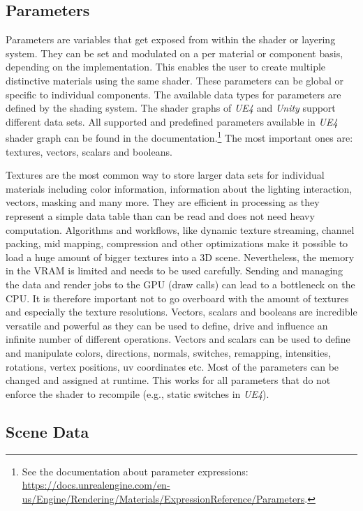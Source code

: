 	\subsection{Parameters}
	
		Parameters are variables that get exposed from within the shader or layering system. They can be set and modulated on a per material or component basis, depending on the implementation. This enables the user to create multiple distinctive materials using the same shader. These parameters can be global or specific to individual components. The available data types for parameters are defined by the shading system. The shader graphs of \emph{UE4} and \emph{Unity} support different data sets. All supported and predefined parameters available in \emph{UE4} shader graph can be found in the documentation.\footnote{See the documentation about parameter expressions: \url{https://docs.unrealengine.com/en-us/Engine/Rendering/Materials/ExpressionReference/Parameters}.} The most important ones are: textures, vectors, scalars and booleans.
		
		Textures are the most common way to store larger data sets for individual materials including color information, information about the lighting interaction, vectors, masking and many more. They are efficient in processing as they represent a simple data table than can be read and does not need heavy computation. Algorithms and workflows, like dynamic texture streaming, channel packing, mid mapping, compression and other optimizations make it possible to load a huge amount of bigger textures into a 3D scene. Nevertheless, the memory in the VRAM is limited and needs to be used carefully. Sending and managing the  data and render jobs to the GPU (draw calls) can lead to a bottleneck on the CPU. It is therefore important not to go overboard with the amount of textures and especially the texture resolutions. Vectors, scalars and booleans are incredible versatile and powerful as they can be used to define, drive and influence an infinite number of different operations. Vectors and scalars can be used to define and manipulate  colors, directions, normals, switches, remapping, intensities, rotations, vertex positions, uv coordinates etc. Most of the parameters can be changed and assigned at runtime. This works for all parameters that do not enforce the shader to recompile (e.g., static switches in \emph{UE4}).
	 	
	 
	\subsection{Scene Data}
	
